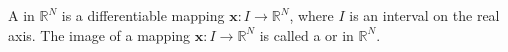 A  in $\mathbb{R}^N$ is a differentiable mapping $\mathbf{x}: I \rightarrow \mathbb{R}^N$, where $I$ is an interval on the real axis. The image of a mapping $\mathbf{x}: I \rightarrow \mathbb{R}^N$ is called a  or  in $\mathbb{R}^N$.
